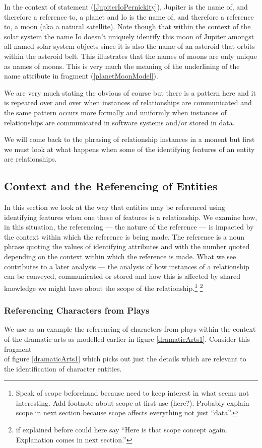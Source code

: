 In the context of statement (\ref{JupiterIoPernickity}), Jupiter is the name of, and therefore  a reference to, a planet and  Io is the name of, and therefore a reference to, a moon (aka a natural satellite).
Note though that within the context of the solar system the name Io  doesn't uniquely identify this moon of Jupiter amongst all named solar system objects since it is also the name of an asteroid that orbits within the asteroid belt. This  illustrates that 
the names of moons are only unique as names of moons. This is very much the meaning of the underlining of the name attribute in fragment (\ref{planetMoonModel}). 

\mynote
We are very much stating the obvious of course but there is a pattern here and it is repeated over and over when instances of relationships are communicated  and the same pattern occurs more formally  and uniformly when instances of relationships are communicated in software systems and/or stored in data.

We will come back to the phrasing of relationship instances in a monent but first we must look at what happens when some of the identifying features of an entity are relationships.

\subsection{Context and the Referencing of Entities}
\mynote
In this section we look at the way that entities may be referenced using identifying features
 when one these of features is a relationship.
We examine how,  in this situation, the referencing 
--- the nature of the reference ---   
is impacted by the context within which the reference is being made. 
The reference is  a noun phrase quoting the values of identifying attributes
and with the number quoted depending on 
the context within which the reference is made.
What we see contributes to a later analysis --- the analysis of  how 
instances of a relationship can be conveyed, communicated or stored and
how this is affected by shared knowledge we might have about 
the scope of  the relationship.\footnote{Speak of scope beforehand because need to keep interest in what seems not interesting. Add footnote about scope at first use (here?). Probably explain scope in next section because scope affects everything not just ``data''.} \footnote{if explained before could here say ``Here is that scope concept again. Explanation comes in next section.''}
\subsubsection{Referencing Characters from Plays}
\mynote
 We use as an example the referencing of characters from  plays
 within the context of  the  dramatic arts
   as modelled earlier in figure \ref{dramaticArts1}.
\mynote
Consider this fragment 
\begin{equation*}

\end{equation*}
of figure \ref{dramaticArts1} which picks out just the details which are
relevant to the identification of character entities.

